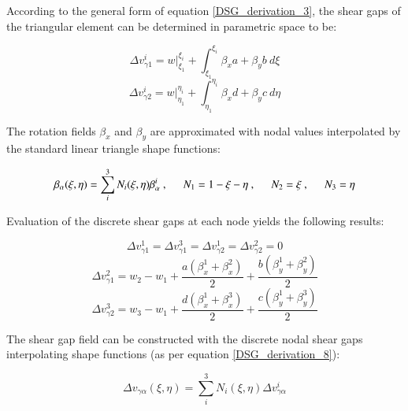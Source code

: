 According to the general form of equation \ref{DSG_derivation_3}, the shear gaps of the triangular element can be determined in parametric space to be:

\begin{equation} 
\Delta v_{\gamma1}^i 
= w |_{\xi_1}^{\xi_i} +  \int_{\xi_1}^{\xi_i} \beta_x a +  \beta_y b \ d\xi
\label{DSG_derivation_6}
\end{equation}
\begin{equation} 
\Delta v_{\gamma2}^i 
= w |_{\eta_1}^{\eta_i} +  \int_{\eta_1}^{\eta_i} \beta_x d +  \beta_y c \ d\eta
\label{DSG_derivation_7}
\end{equation}

The rotation fields $\beta_x$ and $\beta_y$ are approximated with nodal values interpolated by the standard linear triangle shape functions:

\begin{equation} 
\beta_\alpha (\xi,\eta)
= \sum_i^3 N_i (\xi,\eta) \beta_\alpha^i
\ ,
\hspace{5mm}
N_1 = 1-\xi-\eta\ ,
\hspace{5mm}
N_2 = \xi\ ,
\hspace{5mm}
N_3 = \eta
\label{DSG_derivation_8}
\end{equation}

Evaluation of the discrete shear gaps at each node yields the following results:

\begin{equation} 
\Delta v_{\gamma1}^1 = 
\Delta v_{\gamma1}^3 = 
\Delta v_{\gamma2}^1 = 
\Delta v_{\gamma2}^2 = 0
\label{DSG_derivation_9}
\end{equation}
\begin{equation} 
\Delta v_{\gamma1}^2 = 
w_2 - w_1 + \frac{a(\beta_x^1 + \beta_x^2)}{2} + \frac{b(\beta_y^1 + \beta_y^2)}{2}
\label{DSG_derivation_10}
\end{equation}
\begin{equation} 
\Delta v_{\gamma2}^3 = 
w_3 - w_1 + \frac{d(\beta_x^1 + \beta_x^3)}{2} + \frac{c(\beta_y^1 + \beta_y^3)}{2}
\label{DSG_derivation_11}
\end{equation}

The shear gap field can be constructed with the discrete nodal shear gaps interpolating shape functions (as per equation \ref{DSG_derivation_8}):

\begin{equation} 
\Delta v_{\gamma \alpha} (\xi,\eta) 
= \sum_i^3 N_i (\xi,\eta) \Delta v_{\gamma \alpha}^i
\label{DSG_derivation_12}
\end{equation}

